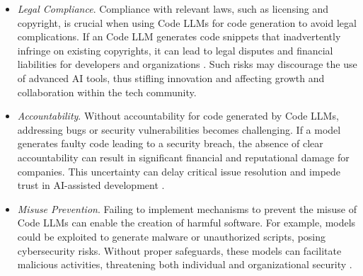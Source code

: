 \begin{itemize}
    \item \textit{Legal Compliance}. Compliance with relevant laws, such as licensing and copyright, is crucial when using Code LLMs for code generation to avoid legal complications. If an Code LLM generates code snippets that inadvertently infringe on existing copyrights, it can lead to legal disputes and financial liabilities for developers and organizations \cite{xu2024first}. Such risks may discourage the use of advanced AI tools, thus stifling innovation and affecting growth and collaboration within the tech community.
    \item \textit{Accountability}. Without accountability for code generated by Code LLMs, addressing bugs or security vulnerabilities becomes challenging. If a model generates faulty code leading to a security breach, the absence of clear accountability can result in significant financial and reputational damage for companies. This uncertainty can delay critical issue resolution and impede trust in AI-assisted development \cite{liesenfeld2023opening}.
    \item \textit{Misuse Prevention}. Failing to implement mechanisms to prevent the misuse of Code LLMs can enable the creation of harmful software. For example, models could be exploited to generate malware or unauthorized scripts, posing cybersecurity risks. Without proper safeguards, these models can facilitate malicious activities, threatening both individual and organizational security \cite{mousavi2024investigation}.

\end{itemize}
